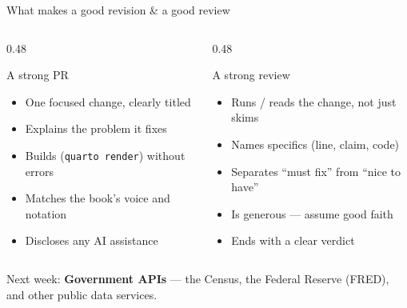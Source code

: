 \documentclass[9pt,aspectratio=169]{beamer}
\begin{document}
\begin{frame}{What makes a good revision \& a good review}
    \begin{columns}[T]
        \begin{column}{0.48\textwidth}
            \begin{block}{A strong PR}
                \begin{itemize}\small
                    \item One focused change, clearly titled
                    \item Explains the problem it fixes
                    \item Builds (\texttt{quarto render}) without errors
                    \item Matches the book's voice and notation
                    \item Discloses any AI assistance
                \end{itemize}
            \end{block}
        \end{column}
        \begin{column}{0.48\textwidth}
            \begin{block}{A strong review}
                \begin{itemize}\small
                    \item Runs / reads the change, not just skims
                    \item Names specifics (line, claim, code)
                    \item Separates ``must fix'' from ``nice to have''
                    \item Is generous --- assume good faith
                    \item Ends with a clear verdict
                \end{itemize}
            \end{block}
        \end{column}
    \end{columns}
    \vspace{0.5em}
    \centering\small Next week: \textbf{Government APIs} --- the Census, the Federal Reserve (FRED), and other public data services.
\end{frame}
\end{document}
